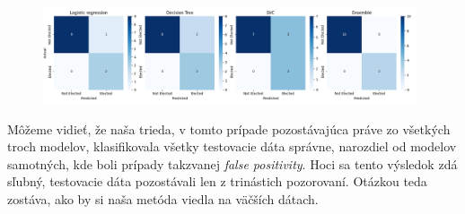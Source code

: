 \documentclass[main.tex]{subfiles}
\begin{document}
\begin{figure}[!htbp]
    \centering
    \includegraphics[width=0.98\textwidth]
    {images/confussion_matrix.png}
    \caption{}
    \label{fig:confussion_matrices}
\end{figure}
Môžeme vidieť, že naša trieda, v tomto prípade pozostávajúca práve zo všetkých troch modelov, klasifikovala všetky testovacie dáta správne, narozdiel od modelov samotných, kde boli prípady takzvanej \textit{false positivity}. Hoci sa tento výsledok zdá sľubný, testovacie dáta pozostávali len z trinástich pozorovaní. Otázkou teda zostáva, ako by si naša metóda viedla na väčších dátach.
\end{document}

